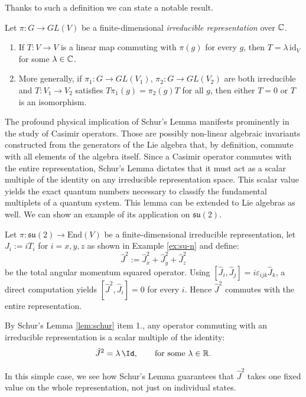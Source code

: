 \noindent Thanks to such a definition we can state a notable result.

\begin{lemma}\label{lem:schur}
	Let $\pi: G \to GL(V)$ be a finite-dimensional \emph{irreducible representation}  over $\mathbb{C}$.
	\begin{enumerate}
		\item If $T: V \to V$ is a linear map commuting with $\pi(g)$ for every $g$, then $T = \lambda \, \mathrm{id}_V$ for some $\lambda \in \mathbb{C}$.
		\item More generally, if $\pi_1: G\to GL(V_1)$, $\pi_2: G\to GL(V_2)$ are both irreducible and $T: V_1 \to V_2$ satisfies $T\pi_1(g) = \pi_2(g)T$ for all $g$, then either $T=0$ or $T$ is an isomorphism.
	\end{enumerate}
\end{lemma}

The profound physical implication of Schur's Lemma manifests prominently in the study of Casimir operators. Those are possibly non-linear algebraic invariants constructed from the generators of the Lie algebra that, by definition, commute with all elements of the algebra itself. Since a Casimir operator commutes with the entire representation, Schur's Lemma dictates that it must act as a scalar multiple of the identity on any irreducible representation space. This scalar value yields the exact quantum numbers necessary to classify the fundamental multiplets of a quantum system. This lemma can be extended to Lie algebras as well. We can show an example of its application on $\mathfrak{su}(2)$.

\begin{example}
	Let $\pi: \mathfrak{su}(2) \to \mathrm{End}(V)$ be a finite-dimensional irreducible representation, let $J_i := i T_i$ for $i = x,y,z$ as shown in Example \ref{ex:su-n} and define:
	\[
	\hat J^2 := \hat J_x^2 + \hat J_y^2 + \hat J_z^2
	\]
	be the total angular momentum squared operator. Using $[\hat J_i, \hat J_j] = i\varepsilon_{ijk}\hat J_k$, a direct computation yields $[\hat J^2, \hat J_i] = 0$ for every $i$. Hence $\hat J^2$ commutes with the entire representation.
	
	\noindent By Schur's Lemma \ref{lem:schur} item 1., any operator commuting with an irreducible representation is a scalar multiple of the identity:
	\[
	\hat J^2 = \lambda\, \Id, \qquad \text{for some } \lambda \in \R.
	\]
	
	\noindent In this simple case, we see how Schur's Lemma guarantees that $\hat J^2$ takes one fixed value on the whole representation, not just on individual states.
\end{example}

